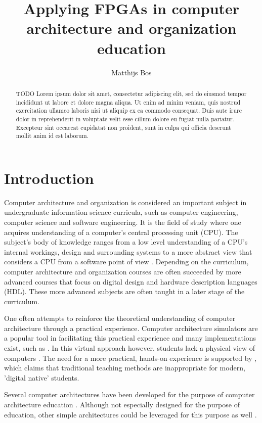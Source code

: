 \documentclass[singleside,openright]{uva-bachelor-thesis}
\title{Applying FPGAs in computer architecture and organization education}
\author{Matthijs Bos}
\begin{document}
\maketitle

\begin{abstract}
TODO
Lorem ipsum dolor sit amet, consectetur adipiscing elit, sed do eiusmod tempor incididunt ut labore et dolore magna aliqua. Ut enim ad minim veniam, quis nostrud exercitation ullamco laboris nisi ut aliquip ex ea commodo consequat. Duis aute irure dolor in reprehenderit in voluptate velit esse cillum dolore eu fugiat nulla pariatur. Excepteur sint occaecat cupidatat non proident, sunt in culpa qui officia deserunt mollit anim id est laborum.
\end{abstract}

\tableofcontents

\chapter{Introduction}
Computer architecture and organization is considered an important subject in undergraduate information science curricula, such as computer engineering, computer science and software engineering. It is the field of study where one acquires understanding of a computer's central processing unit (CPU). The subject's body of knowledge ranges from a low level understanding of a CPU's internal workings, design and surrounding systems to a more abstract view that considers a CPU from a software point of view \cite[p.60]{soldan2004computer}. Depending on the curriculum, computer architecture and organization courses are often succeeded by more advanced courses that focus on digital design and hardware description languages (HDL). These more advanced subjects are often taught in a later stage of the curriculum. 

One often attempts to reinforce the theoretical understanding of computer architecture through a practical experience. Computer architecture simulators are a popular tool in facilitating this practical experience and many implementations exist, such as \cite{mariesim}. In this virtual approach however, students lack a physical view of computers \cite[p.1]{nativeFPGA}. The need for a more practical, hands-on experience is supported by \cite{digitalNatives}, which claims that traditional teaching methods are inappropriate for modern, 'digital native' students.

Several computer architectures have been developed for the purpose of computer architecture education \cite{nativeFPGA, jansen2014every, 6211804, nakano2008processor, holland2003harnessing}. Although not especially designed for the purpose of education, other simple architectures could be leveraged for this purpose as well \cite{suresh2014fpga}.
\end{document}
